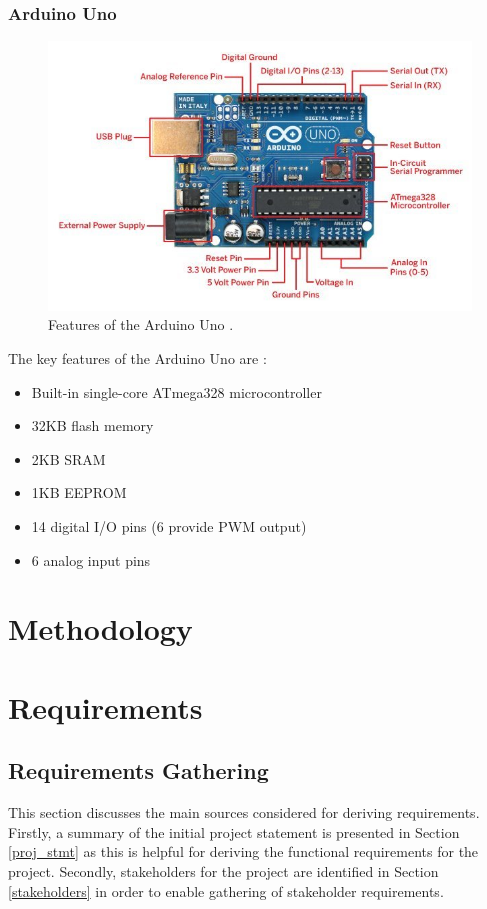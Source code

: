 \documentclass{UoYCSproject}
\begin{document}
\subsection{Arduino Uno}
\begin{figure}[h!]
  \includegraphics[width=\linewidth]{graphics/arduino_board.jpg}
  \caption{Features of the Arduino Uno \parencite{arduinodiagram}.}
  \label{fig:arduino_uno}
\end{figure}

The key features of the Arduino Uno are \parencite{arduinospec}:
\begin{itemize}
\item Built-in single-core ATmega328 microcontroller
\item 32KB flash memory
\item 2KB SRAM
\item 1KB EEPROM
\item 14 digital I/O pins (6 provide PWM output)
\item 6 analog input pins
\end{itemize}

\chapter{Methodology}

\chapter{Requirements}
\section{Requirements Gathering}
This section discusses the main sources considered for deriving requirements. Firstly, a summary of the initial project statement is presented in Section \ref{proj_stmt} as this is helpful for deriving the functional requirements for the project. Secondly, stakeholders for the project are identified in Section \ref{stakeholders} in order to enable gathering of stakeholder requirements.
\end{document}
